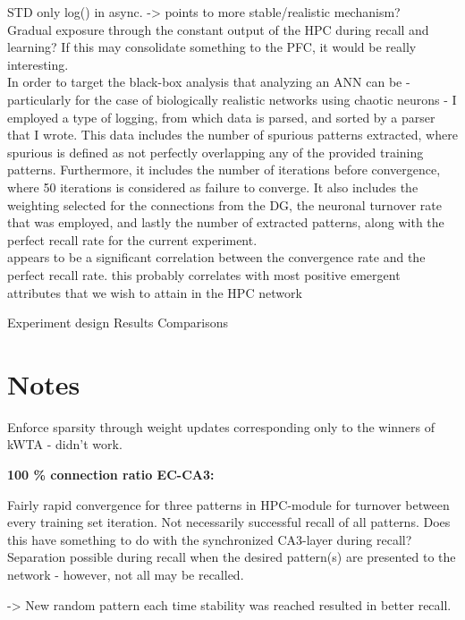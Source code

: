 STD only log() in async. -> points to more stable/realistic mechanism?
\\

Gradual exposure through the constant output of the HPC during recall and learning? If this may consolidate something to the PFC, it would be really interesting.
\\

In order to target the black-box analysis that analyzing an ANN can be - particularly for the case of biologically realistic networks using chaotic neurons - I employed a type of logging, from which data is parsed, and sorted by a parser that I wrote. This data includes the number of spurious patterns extracted, where spurious is defined as not perfectly overlapping any of the provided training patterns. Furthermore, it includes the number of iterations before convergence, where 50 iterations is considered as failure to converge. It also includes the weighting selected for the connections from the DG, the neuronal turnover rate that was employed, and lastly the number of extracted patterns, along with the perfect recall rate for the current experiment.
\\

appears to be a significant correlation between the convergence rate and the perfect recall rate. this probably correlates with most positive emergent attributes that we wish to attain in the HPC network


Experiment design
Results
Comparisons

\section*{Notes}

Enforce sparsity through weight updates corresponding only to the winners of kWTA - didn't work.

\textbf{100 \% connection ratio EC-CA3:}

Fairly rapid convergence for three patterns in HPC-module for turnover between every training set iteration. 
Not necessarily successful recall of all patterns. Does this have something to do with the synchronized CA3-layer during recall? Separation possible during recall when the desired pattern(s) are presented to the network - however, not all may be recalled.

-> New random pattern each time stability was reached resulted in better recall.

